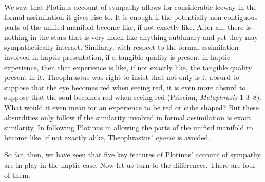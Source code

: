 We saw that Plotinus account of sympathy allows for considerable leeway in the formal assimilation it gives rise to. It is enough if the potentially non-contiguous parts of the unified manifold become like, if not exactly like. After all, there is nothing in the stars that is very much like anything sublunary and yet they may sympathetically interact. Similarly, with respect to the formal assimilation involved in haptic presentation, if a tangible quality is present in haptic experience, then that experience is like, if not exactly like, the tangible quality present in it. Theophrastus was right to insist that not only is it absurd to suppose that the eye becomes red when seeing red, it is even more absurd to suppose that the soul becomes red when seeing red (Priscian, \emph{Metaphrasis} 1 3--8). What would it even mean for an experience to be red or cube shaped? But these absurdities only follow if the similarity involved in formal assimilation is exact similarity. In following Plotinus in allowing the parts of the unified manifold to become like, if not exactly alike, Theophrastus' \emph{aporia} is avoided. 

So far, then, we have seen that five key features of Plotinus' account of sympathy are in play in the haptic case. Now let us turn to the differences. There are four of them.

